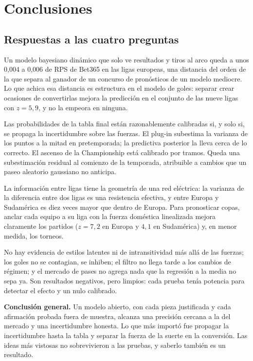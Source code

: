 \chapter{Conclusiones}
\label{cap:conclusiones}

\section{Respuestas a las cuatro preguntas}

 Un modelo bayesiano dinámico que solo ve resultados y tiros al arco queda a unos 0,004 a 0,006 de RPS de Bet365 en las ligas europeas, una distancia del orden de la que separa al ganador de un concurso de pronósticos de un modelo mediocre. Lo que achica esa distancia es estructura en el modelo de goles: separar crear ocasiones de convertirlas mejora la predicción en el conjunto de las nueve ligas con $z=5{,}9$, y no la empeora en ninguna.

 Las probabilidades de la tabla final están razonablemente calibradas si, y solo si, se propaga la incertidumbre sobre las fuerzas. El plug-in subestima la varianza de los puntos a la mitad en pretemporada; la predictiva posterior la lleva cerca de lo correcto. El ascenso de la Championship está calibrado por tramos. Queda una subestimación residual al comienzo de la temporada, atribuible a cambios que un paseo aleatorio gaussiano no anticipa.

 La información entre ligas tiene la geometría de una red eléctrica: la varianza de la diferencia entre dos ligas es una resistencia efectiva, y entre Europa y Sudamérica es diez veces mayor que dentro de Europa. Para pronosticar copas, anclar cada equipo a su liga con la fuerza doméstica linealizada mejora claramente los partidos ($z=7{,}2$ en Europa y $4{,}1$ en Sudamérica) y, en menor medida, los torneos.

 No hay evidencia de estilos latentes ni de intransitividad más allá de las fuerzas; los goles no se contagian, se inhiben; el filtro no llega tarde a los cambios de régimen; y el mercado de pases no agrega nada que la regresión a la media no sepa ya. Son resultados negativos, pero limpios: cada prueba tenía potencia para detectar el efecto y un nulo calibrado.

\begin{conclusion}
\textsf{\bfseries\color{cdblue}Conclusión general.} Un modelo abierto, con cada pieza justificada y cada afirmación probada fuera de muestra, alcanza una precisión cercana a la del mercado y una incertidumbre honesta. Lo que más importó fue propagar la incertidumbre hasta la tabla y separar la fuerza de la suerte en la conversión. Las ideas más vistosas no sobrevivieron a las pruebas, y saberlo también es un resultado.
\end{conclusion}


